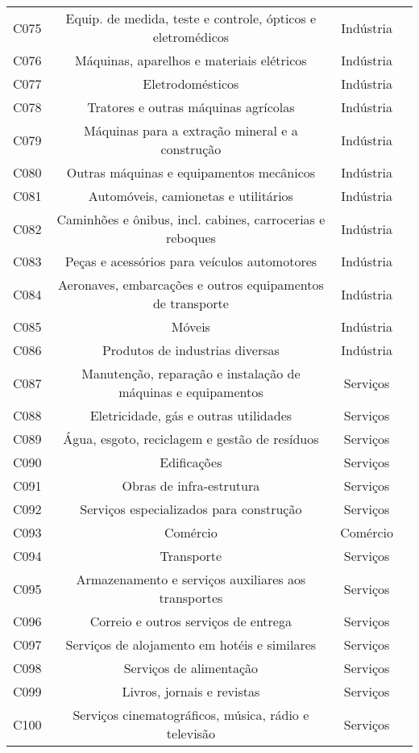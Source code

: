 \begin{apendicesenv}
\begin{small}
\begin{center}
\begin{longtable}{lccc}
				C075 & Equip. de medida, teste e controle, ópticos e eletromédicos & Indústria \\
				C076 & Máquinas, aparelhos e materiais elétricos & Indústria \\
				C077 & Eletrodomésticos & Indústria \\
				C078 & Tratores e outras máquinas agrícolas & Indústria \\
				C079 & Máquinas para a extração mineral e a construção & Indústria \\
				C080 & Outras máquinas e equipamentos mecânicos & Indústria \\
				C081 & Automóveis, camionetas e utilitários & Indústria \\
				C082 & Caminhões e ônibus, incl. cabines, carrocerias e reboques & Indústria \\
				C083 & Peças e acessórios para veículos automotores & Indústria \\
				C084 & Aeronaves, embarcações e outros equipamentos de transporte & Indústria \\
				C085 & Móveis & Indústria \\
				C086 & Produtos de industrias diversas & Indústria \\
				C087 & Manutenção, reparação e instalação de máquinas e equipamentos & Serviços \\
				C088 & Eletricidade, gás e outras utilidades & Serviços \\
				C089 & Água, esgoto, reciclagem e gestão de resíduos & Serviços \\
				C090 & Edificações & Serviços \\
				C091 & Obras de infra-estrutura & Serviços \\
				C092 & Serviços especializados para construção & Serviços \\
				C093 & Comércio & Comércio \\
				C094 & Transporte & Serviços \\
				C095 & Armazenamento e serviços auxiliares aos transportes & Serviços \\
				C096 & Correio e outros serviços de entrega & Serviços \\
				C097 & Serviços de alojamento em hotéis e similares & Serviços \\
				C098 & Serviços  de alimentação & Serviços \\
				C099 & Livros, jornais e revistas & Serviços \\
				C100 & Serviços cinematográficos, música, rádio e televisão & Serviços \\

\end{longtable}
\end{center}
\end{small}
\end{apendicesenv}
